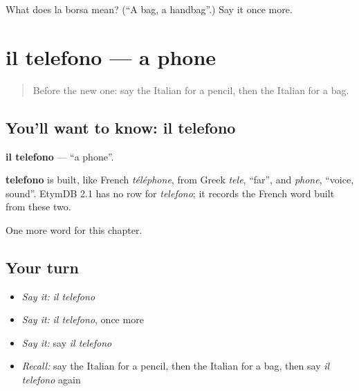 \begin{tcolorbox}[breakable,colback=teal!4,colframe=teal!35!black,title={Before you move on}]
What does la borsa mean? (\textquotedblleft{}A bag, a handbag\textquotedblright{}.) Say it once more.
\end{tcolorbox}
\section[il telefono]{il telefono — a phone}

\label{lesson:IT-C62-telefono}



\begin{quote}
Before the new one: say the Italian for a pencil, then the Italian for a bag.
\end{quote}

\subsection*{You'll want to know: il telefono}
\textbf{il telefono} — \textquotedblleft{}a phone\textquotedblright{}.

\begin{cousinweb}
\textbf{telefono} is built, like French \emph{téléphone}, from Greek \emph{tele}, \textquotedblleft{}far\textquotedblright{}, and \emph{phone}, \textquotedblleft{}voice, sound\textquotedblright{}. EtymDB 2.1 has no row for \emph{telefono}; it records the French word built from these two.
\end{cousinweb}

\begin{grammarlens}[title={What you've built}]
One more word for this chapter.
\end{grammarlens}

\subsection*{Your turn}
\begin{itemize}
\raggedright
  \item \emph{Say it:} \emph{il telefono}
  \item \emph{Say it:} \emph{il telefono}, once more
  \item \emph{Say it:} say \emph{il telefono}
  \item \emph{Recall:} say the Italian for a pencil, then the Italian for a bag, then say \emph{il telefono} again
\end{itemize}

